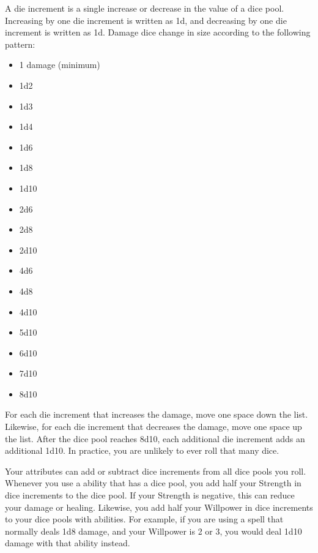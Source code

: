             A die increment is a single increase or decrease in the value of a dice pool.
            Increasing by one die increment is written as \plus1d, and decreasing by one die increment is written as \minus1d.
            Damage dice change in size according to the following pattern:
            \begin{itemize}
                \item 1 damage (minimum)
                \item 1d2
                \item 1d3
                \item 1d4
                \item 1d6
                \item 1d8
                \item 1d10
                \item 2d6
                \item 2d8
                \item 2d10
                \item 4d6
                \item 4d8
                \item 4d10
                \item 5d10
                \item 6d10
                \item 7d10
                \item 8d10
            \end{itemize}

            For each die increment that increases the damage, move one space down the list.
            Likewise, for each die increment that decreases the damage, move one space up the list.
            After the dice pool reaches 8d10, each additional die increment adds an additional 1d10.
            In practice, you are unlikely to ever roll that many dice.

            \label{Dice Bonuses From Attributes} Your attributes can add or subtract dice increments from all dice pools you roll.
            Whenever you use a  ability that has a dice pool, you add half your Strength in dice increments to the dice pool.
            If your Strength is negative, this can reduce your damage or healing.
            Likewise, you add half your Willpower in dice increments to your dice pools with  abilities.
            For example, if you are using a spell that normally deals 1d8 damage, and your Willpower is 2 or 3, you would deal 1d10 damage with that ability instead.

